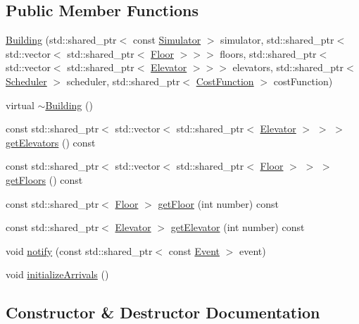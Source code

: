 \subsection*{Public Member Functions}
\begin{DoxyCompactItemize}
\item 
\hyperlink{class_building_a7b82d219d50105ca73fd18fb72f7d97d}{Building} (std\+::shared\+\_\+ptr$<$ const \hyperlink{class_simulator}{Simulator} $>$ simulator, std\+::shared\+\_\+ptr$<$ std\+::vector$<$ std\+::shared\+\_\+ptr$<$ \hyperlink{class_floor}{Floor} $>$$>$$>$ floors, std\+::shared\+\_\+ptr$<$ std\+::vector$<$ std\+::shared\+\_\+ptr$<$ \hyperlink{class_elevator}{Elevator} $>$$>$$>$ elevators, std\+::shared\+\_\+ptr$<$ \hyperlink{class_scheduler}{Scheduler} $>$ scheduler, std\+::shared\+\_\+ptr$<$ \hyperlink{class_cost_function}{Cost\+Function} $>$ cost\+Function)
\item 
virtual \hyperlink{class_building_ab675c6a382e110b84031956cda708439}{$\sim$\+Building} ()
\item 
const std\+::shared\+\_\+ptr$<$ std\+::vector$<$ std\+::shared\+\_\+ptr$<$ \hyperlink{class_elevator}{Elevator} $>$ $>$ $>$ \hyperlink{class_building_a6cf389ad55a55b0d3681808025625c4a}{get\+Elevators} () const 
\item 
const std\+::shared\+\_\+ptr$<$ std\+::vector$<$ std\+::shared\+\_\+ptr$<$ \hyperlink{class_floor}{Floor} $>$ $>$ $>$ \hyperlink{class_building_a1271cef8df030a441d37eec8f8245928}{get\+Floors} () const 
\item 
const std\+::shared\+\_\+ptr$<$ \hyperlink{class_floor}{Floor} $>$ \hyperlink{class_building_a55712da518a32920146db267072362f2}{get\+Floor} (int number) const 
\item 
const std\+::shared\+\_\+ptr$<$ \hyperlink{class_elevator}{Elevator} $>$ \hyperlink{class_building_aea6f1c1241ae910793a4a80bf0cadc02}{get\+Elevator} (int number) const 
\item 
void \hyperlink{class_building_a380e65fcb24d40d82077edc0572df3c1}{notify} (const std\+::shared\+\_\+ptr$<$ const \hyperlink{class_event}{Event} $>$ event)
\item 
void \hyperlink{class_building_ad92eb27909cc8e59a2a775d7b214d13c}{initialize\+Arrivals} ()
\end{DoxyCompactItemize}


\subsection{Constructor \& Destructor Documentation}
\hypertarget{class_building_a7b82d219d50105ca73fd18fb72f7d97d}{}
